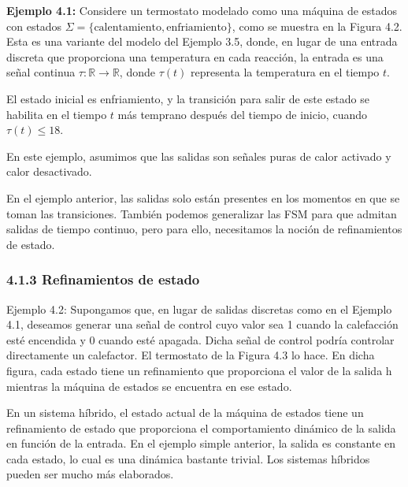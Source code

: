 \begin{tcolorbox}
\textbf{Ejemplo 4.1:} Considere un termostato modelado como una máquina de estados con estados 
\(\Sigma = \{\text{calentamiento}, \text{enfriamiento}\}\), como se muestra en la Figura 4.2. 
Esta es una variante del modelo del Ejemplo 3.5, donde, en lugar de una entrada discreta que proporciona una 
temperatura en cada reacción, la entrada es una señal continua 
\(\tau: \mathbb{R} \to \mathbb{R}\), donde \(\tau(t)\) representa la temperatura en el tiempo \(t\).  

El estado inicial es enfriamiento, y la transición para salir de este estado se habilita en el tiempo \(t\) más 
temprano después del tiempo de inicio, cuando \(\tau(t) \leq 18\).  

En este ejemplo, asumimos que las salidas son señales puras de calor activado y calor desactivado.

\end{tcolorbox}

En el ejemplo anterior, las salidas solo están presentes en los momentos en que se toman las transiciones. 
También podemos generalizar las FSM para que admitan salidas de tiempo continuo, pero para ello, necesitamos 
la noción de refinamientos de estado.  

\subsubsection*{4.1.3 Refinamientos de estado}


\begin{tcolorbox}
    Ejemplo 4.2: Supongamos que, en lugar de salidas discretas como en el Ejemplo 4.1, deseamos generar una señal de control cuyo valor sea 1 cuando la calefacción esté encendida y 0 cuando esté apagada. Dicha señal de control podría controlar directamente un calefactor. El termostato de la Figura 4.3 lo hace. En dicha figura, cada estado tiene un refinamiento que proporciona el valor de la salida h mientras la máquina de estados se encuentra en ese estado.
\end{tcolorbox}
En un sistema híbrido, el estado actual de la máquina de estados tiene un refinamiento de estado que proporciona el comportamiento dinámico de la salida en función de la entrada. En el ejemplo simple anterior, la salida es constante en cada estado, lo cual es una dinámica bastante trivial. Los sistemas híbridos pueden ser mucho más elaborados.

